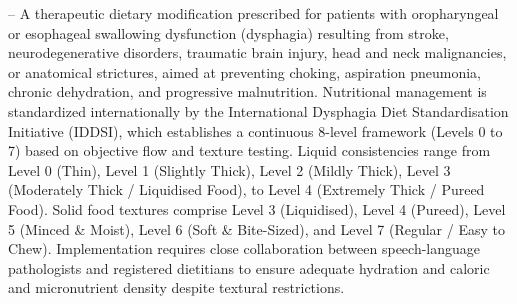 -- A therapeutic dietary modification prescribed for patients with oropharyngeal or esophageal swallowing dysfunction (dysphagia) resulting from stroke, neurodegenerative disorders, traumatic brain injury, head and neck malignancies, or anatomical strictures, aimed at preventing choking, aspiration pneumonia, chronic dehydration, and progressive malnutrition. Nutritional management is standardized internationally by the International Dysphagia Diet Standardisation Initiative (IDDSI), which establishes a continuous 8-level framework (Levels 0 to 7) based on objective flow and texture testing. Liquid consistencies range from Level 0 (Thin), Level 1 (Slightly Thick), Level 2 (Mildly Thick), Level 3 (Moderately Thick / Liquidised Food), to Level 4 (Extremely Thick / Pureed Food). Solid food textures comprise Level 3 (Liquidised), Level 4 (Pureed), Level 5 (Minced \& Moist), Level 6 (Soft \& Bite-Sized), and Level 7 (Regular / Easy to Chew). Implementation requires close collaboration between speech-language pathologists and registered dietitians to ensure adequate hydration and caloric and micronutrient density despite textural restrictions.

